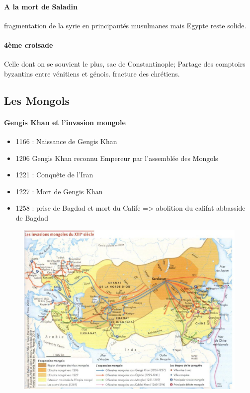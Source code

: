\paragraph{A la mort de Saladin} fragmentation de la syrie en principautés musulmanes mais Egypte reste solide. 

\paragraph{4ème croisade} Celle dont on se souvient le plus, sac de Constantinople; Partage des comptoirs byzantins entre vénitiens et génois. fracture des chrétiens. 

\subsection{Les Mongols}

\paragraph{Gengis Khan et l’invasion mongole}
\begin{itemize}
    \item 1166
: Naissance de Gengis Khan
    \item 1206
Gengis Khan reconnu Empereur par l’assemblée des Mongols
    \item 1221
: Conquête de l’Iran
    \item 1227
: Mort de Gengis Khan
    \item 1258
: prise de Bagdad et mort du Calife => abolition du califat abbasside de Bagdad
\end{itemize}

  \begin{figure}[h!]
\centering
{}
\includegraphics[width=\textwidth]{HistoireIslamMediterranee/Images/Mongol.jpg}
     
     \label{fig:Mongols}
 \end{figure}

